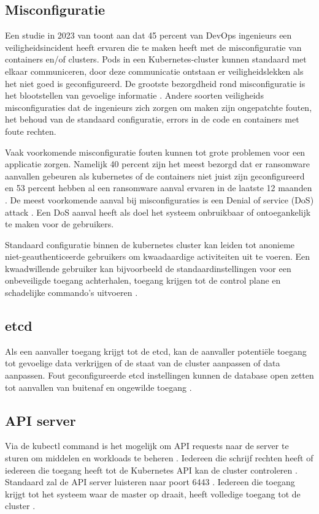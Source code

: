 \subsection{Misconfiguratie}
Een studie in 2023 van \textcite{red-hat-2023} toont aan dat 45 percent van DevOps ingenieurs een veiligheidsincident heeft ervaren die te maken heeft met de misconfiguratie van containers en/of clusters. Pods in een Kubernetes-cluster kunnen standaard met elkaar communiceren, door deze communicatie ontstaan er veiligheidslekken als het niet goed is geconfigureerd. De grootste bezorgdheid rond misconfiguratie is het blootstellen van gevoelige informatie \autocite{red-hat-2023}. Andere soorten veiligheids misconfiguraties dat de ingenieurs zich zorgen om maken zijn ongepatchte fouten, het behoud van de standaard configuratie, errors in de code en containers met foute rechten. \newline

Vaak voorkomende misconfiguratie fouten kunnen tot grote problemen voor een applicatie zorgen. Namelijk 40 percent zijn het meest bezorgd dat er ransomware aanvallen gebeuren als kubernetes of de containers niet juist zijn geconfigureerd en 53 percent hebben al een ransomware aanval ervaren in de laatste 12 maanden \autocite{red-hat-2023}. De meest voorkomende aanval bij misconfiguraties is een Denial of service (DoS) attack \autocite{red-hat-2023}. Een DoS aanval heeft als doel het systeem onbruikbaar of ontoegankelijk te maken voor de gebruikers. \newline

Standaard configuratie binnen de kubernetes cluster kan leiden tot anonieme niet-geauthenticeerde gebruikers om kwaadaardige activiteiten uit te voeren. Een kwaadwillende gebruiker kan bijvoorbeeld de standaardinstellingen voor een onbeveiligde toegang achterhalen, toegang krijgen tot de control plane en schadelijke commando's uitvoeren \autocite{shamim2020xi}.

\subsection{etcd}
Als een aanvaller toegang krijgt tot de etcd, kan de aanvaller potentiële toegang tot gevoelige data verkrijgen of de staat van de cluster aanpassen of data aanpassen. Fout geconfigureerde etcd instellingen kunnen de database open zetten tot aanvallen van buitenaf en ongewilde toegang \autocite{KubernetesDocs-2023}.

\subsection{API server}
Via de kubectl command is het mogelijk om API requests naar de server te sturen om middelen en workloads te beheren \autocite{KubernetesDocs-2023}. Iedereen die schrijf rechten heeft of iedereen die toegang heeft tot de Kubernetes API kan de cluster controleren \autocite{KubernetesDocs-2023}. 
Standaard zal de API server luisteren naar poort 6443 \autocite{KubernetesDocs-2023}. Iedereen die toegang krijgt tot het systeem waar de master op draait, heeft volledige toegang tot de cluster \autocite{Rice2018}. \newline

